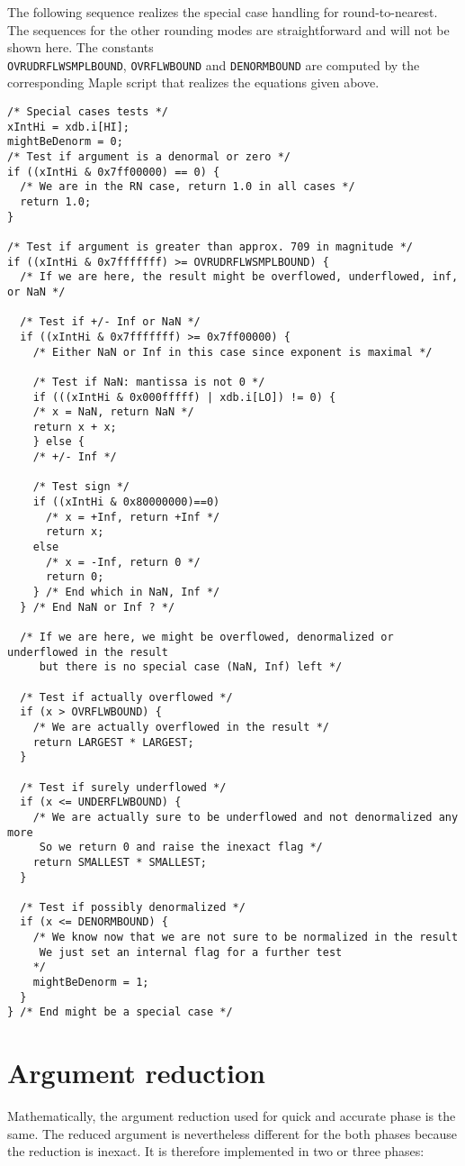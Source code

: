 The following sequence realizes the special case handling for
round-to-nearest. The sequences for the other rounding modes are
straightforward and will not be shown here. The constants\\
\texttt{OVRUDRFLWSMPLBOUND}, \texttt{OVRFLWBOUND} and
\texttt{DENORMBOUND} are computed by the corresponding Maple script
that realizes the equations given above.
\begin{lstlisting}[caption={Handling special cases},firstnumber=1]
/* Special cases tests */
xIntHi = xdb.i[HI];
mightBeDenorm = 0;
/* Test if argument is a denormal or zero */
if ((xIntHi & 0x7ff00000) == 0) {
  /* We are in the RN case, return 1.0 in all cases */
  return 1.0;
}

/* Test if argument is greater than approx. 709 in magnitude */
if ((xIntHi & 0x7fffffff) >= OVRUDRFLWSMPLBOUND) {
  /* If we are here, the result might be overflowed, underflowed, inf, or NaN */

  /* Test if +/- Inf or NaN */
  if ((xIntHi & 0x7fffffff) >= 0x7ff00000) {
    /* Either NaN or Inf in this case since exponent is maximal */

    /* Test if NaN: mantissa is not 0 */
    if (((xIntHi & 0x000fffff) | xdb.i[LO]) != 0) {
	/* x = NaN, return NaN */
	return x + x;
    } else {
	/* +/- Inf */

	/* Test sign */
	if ((xIntHi & 0x80000000)==0) 
	  /* x = +Inf, return +Inf */
	  return x;
	else
	  /* x = -Inf, return 0 */
	  return 0;
    } /* End which in NaN, Inf */
  } /* End NaN or Inf ? */
  
  /* If we are here, we might be overflowed, denormalized or underflowed in the result 
     but there is no special case (NaN, Inf) left */

  /* Test if actually overflowed */
  if (x > OVRFLWBOUND) {
    /* We are actually overflowed in the result */
    return LARGEST * LARGEST;
  }

  /* Test if surely underflowed */
  if (x <= UNDERFLWBOUND) {
    /* We are actually sure to be underflowed and not denormalized any more 
	 So we return 0 and raise the inexact flag */
    return SMALLEST * SMALLEST;
  }
     
  /* Test if possibly denormalized */
  if (x <= DENORMBOUND) {
    /* We know now that we are not sure to be normalized in the result
	 We just set an internal flag for a further test 
    */
    mightBeDenorm = 1;
  }
} /* End might be a special case */
\end{lstlisting}
\section{Argument reduction}\label{sec:expargred}
Mathematically, the argument reduction used for quick and accurate phase is the same.
The reduced argument is nevertheless different for the both phases because the
reduction is inexact. It is therefore implemented in two or three phases:

